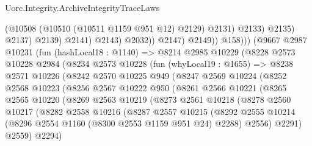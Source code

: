 \begin{lexlean}{Uorc.Integrity.ArchiveIntegrityTraceLaws}
\begin{coremodule}
                                      (@10508 (@10510 (@10511 @1159 @951 @12) @2129) @2131)
                                      @2133)
                                    @2135)
                                  @2137)
                                @2139)
                              @2141)
                            @2143)
                          @2032))
                      @2147)
                    @2149))
                @158)))
          (@9667
            @2987
            @10231
            (fun (hashLocal18 : @1140) =>
            @8214
              @2985
              @10229
              (@8228
                @2573
                @10228
                @2984
                (@8234
                  @2573
                  @10228
                  (fun (whyLocal19 : @1655) =>
                  @8238
                    @2571
                    @10226
                    (@8242
                      @2570
                      @10225
                      @949
                      (@8247
                        @2569
                        @10224
                        (@8252
                          @2568
                          @10223
                          (@8256
                            @2567
                            @10222
                            @950
                            (@8261
                              @2566
                              @10221
                              (@8265
                                @2565
                                @10220
                                (@8269
                                  @2563
                                  @10219
                                  (@8273
                                    @2561
                                    @10218
                                    (@8278
                                      @2560
                                      @10217
                                      (@8282
                                        @2558
                                        @10216
                                        (@8287
                                          @2557
                                          @10215
                                          (@8292
                                            @2555
                                            @10214
                                            (@8296 @2554 @1160 (@8300 @2553 @1159 @951 @24) @2288)
                                            @2556)
                                          @2291)
                                        @2559)
                                      @2294)

\end{coremodule}
\end{lexlean}
